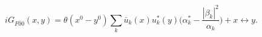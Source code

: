 \begin{equation} \label{feynman two point function solution}
iG_{F\bar{0}{0}} (x,y) = \theta(x^0-y^0) \sum_k \bar{u}_k (x) u_k ^* (y) \bigl( \alpha_k ^* - \frac{ |\beta_k| ^2}{\alpha_k} \bigr) +
x\leftrightarrow y.
\end{equation}

